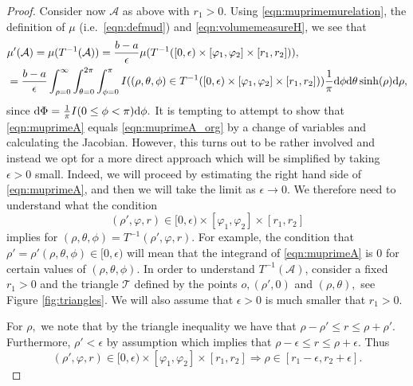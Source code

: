 \documentclass[a4paper,12pt]{article}
\newcommand{\CA}{{\mathcal{A}}}
\newcommand{\CT}{{\mathcal{T}}}
\newcommand{\dd}{{\rm d}}
\begin{document}
\begin{proof}
Consider now $\CA$ as above with $r_1>0.$
Using \eqref{eqn:muprimemurelation}, the definition of 
$\mu$ (i.e.\ \eqref{eqn:defmud}) and \eqref{eqn:volumemeasureH},
we see that 
\begin{align} \label{eqn:muprimeA}
    & \mu'(\CA)=\mu(T^{-1}(\CA)) 
    =\frac{b-a}{\epsilon}\mu(T^{-1}([0,\epsilon) \times [\varphi_1,\varphi_2]\times [r_1,r_2] )),\\
& =\frac{b-a}{\epsilon }\int_{\rho=0}^\infty \int_{\theta=0}^{2 \pi} \int_{\phi=0}^{\pi} 
I((\rho,\theta,\phi)\in T^{-1}([0,\epsilon) \times [\varphi_1,\varphi_2]\times [r_1,r_2] )) 
\frac{1}{\pi}\dd \phi \dd \theta \sinh(\rho) \dd \rho, 
\nonumber 
\end{align}
since $\dd \Phi=\frac{1}{\pi}I(0\leq \phi< \pi)\dd \phi.$
It is tempting to attempt to 
show that \eqref{eqn:muprimeA} equals \eqref{eqn:muprimeA_org} by a change of 
variables and calculating the Jacobian. However, this turns out to be rather 
involved and instead we opt for a more direct approach which will be simplified by 
taking $\epsilon>0$ small.
Indeed, we will proceed by estimating the right hand side of \eqref{eqn:muprimeA},
and then we will take the limit as $\epsilon \to 0.$ We therefore need to 
understand what the condition
\[
(\rho',\varphi,r)\in [0,\epsilon)\times [\varphi_1,\varphi_2]\times [r_1,r_2]
\]
implies for $(\rho,\theta,\phi)= T^{-1}(\rho',\varphi,r)$. 
For example, the condition 
that $\rho'=\rho'(\rho,\theta,\phi)\in[0,\epsilon)$ will mean that the integrand 
of \eqref{eqn:muprimeA} is 0 for certain values of $(\rho,\theta,\phi).$
In order to understand $T^{-1}(\CA)$, consider a fixed $r_1>0$ and 
the triangle $\CT$ defined by the points $o,(\rho',0)$ and $(\rho,\theta),$
see Figure \ref{fig:triangles}. 
We will also assume that $\epsilon>0$ is much smaller 
that $r_1>0.$ 

For $\rho,$ we note that by the triangle inequality 
we have that $\rho-\rho' \leq r \leq \rho +\rho'.$ Furthermore, $\rho'<\epsilon$ 
by assumption which implies that $\rho-\epsilon \leq r \leq \rho +\epsilon.$ Thus
\begin{equation} \label{eqn:rhoimpliedbounds}
(\rho',\varphi,r)\in[0,\epsilon) \times [\varphi_1,\varphi_2]
\times [r_1,r_2] 
\Rightarrow \rho\in[r_1-\epsilon,r_2+\epsilon] .
\end{equation}
  



\end{proof}
\end{document}
